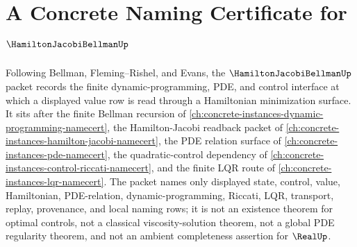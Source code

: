 \chapter{A Concrete Naming Certificate for $\HamiltonJacobiBellmanUp$}
\label{ch:concrete-instances-hamilton-jacobi-bellman-namecert}

Following Bellman, Fleming--Rishel, and Evans, the $\HamiltonJacobiBellmanUp$ packet records the finite dynamic-programming, PDE, and control interface at which a displayed value row is read through a Hamiltonian minimization surface. It sits after the finite Bellman recursion of \autoref{ch:concrete-instances-dynamic-programming-namecert}, the Hamilton-Jacobi readback packet of \autoref{ch:concrete-instances-hamilton-jacobi-namecert}, the PDE relation surface of \autoref{ch:concrete-instances-pde-namecert}, the quadratic-control dependency of \autoref{ch:concrete-instances-control-riccati-namecert}, and the finite LQR route of \autoref{ch:concrete-instances-lqr-namecert}. The packet names only displayed state, control, value, Hamiltonian, PDE-relation, dynamic-programming, Riccati, LQR, transport, replay, provenance, and local naming rows; it is not an existence theorem for optimal controls, not a classical viscosity-solution theorem, not a global PDE regularity theorem, and not an ambient completeness assertion for $\RealUp$.


